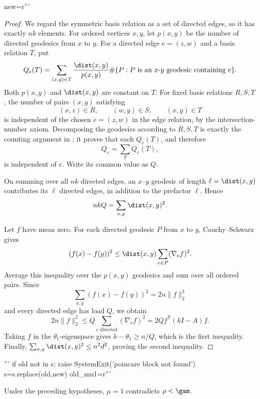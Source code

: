 new=r'''\begin{proof}
We regard the symmetric basis relation as a set of directed edges, so it has exactly $nk$ elements.  For ordered vertices $x,y$, let $p(x,y)$ be the number of directed geodesics from $x$ to $y$.  For a directed edge $e=(z,w)$ and a basis relation $T$, put
\[
 Q_e(T)=\sum_{(x,y)\in T}\frac{\dist(x,y)}{p(x,y)}
 \#\{P:P\text{ is an }x\text{-}y\text{ geodesic containing }e\}.
\]
Both $p(x,y)$ and $\dist(x,y)$ are constant on $T$.  For fixed basis relations $R,S,T$, the number of pairs $(x,y)$ satisfying
\[
 (x,z)\in R,\qquad (w,y)\in S,\qquad (x,y)\in T
\]
is independent of the chosen $e=(z,w)$ in the edge relation, by the intersection-number axiom.  Decomposing the geodesics according to $R,S,T$ is exactly the counting argument in \cite[Proposition 2.8]{PS}; it proves that each $Q_e(T)$, and therefore
\[
 Q_e=\sum_T Q_e(T),
\]
is independent of $e$.  Write its common value as $Q$.

On summing over all $nk$ directed edges, an $x$--$y$ geodesic of length
$\ell=\dist(x,y)$ contributes its $\ell$ directed edges, in addition to the prefactor $\ell$.  Hence
\[
 nkQ=\sum_{x,y}\dist(x,y)^2.
\]

Let $f$ have mean zero.  For each directed geodesic $P$ from $x$ to $y$, Cauchy--Schwarz gives
\[
 (f(x)-f(y))^2\le
 \dist(x,y)\sum_{e\in P}(\nabla_e f)^2.
\]
Average this inequality over the $p(x,y)$ geodesics and sum over all ordered pairs.  Since
\[
 \sum_{x,y}(f(x)-f(y))^2=2n\|f\|_2^2
\]
and every directed edge has load $Q$, we obtain
\[
 2n\|f\|_2^2\le Q\sum_{e\text{ directed}}(\nabla_e f)^2
 =2Q f^{\mathsf T}(kI-A)f.
\]
Taking $f$ in the $\theta_1$-eigenspace gives $k-\theta_1\ge n/Q$, which is the first inequality.  Finally,
$\sum_{x,y}\dist(x,y)^2\le n^2d^2$, proving the second inequality.
\end{proof}'''
if old not in s:
    raise SystemExit('poincare block not found')
s=s.replace(old,new)
old_mu1=r'''\begin{proposition}[The case $\mu=1$]\label{prop:mu1}
Under the preceding hypotheses, $\mu=1$ contradicts $\rho<\gam$.
\end{proposition}

